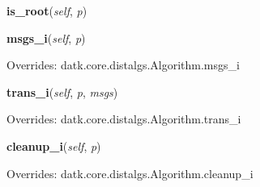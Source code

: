     \vspace{0.5ex}

\hspace{.8\funcindent}\begin{boxedminipage}{\funcwidth}

    \raggedright \textbf{is\_root}(\textit{self}, \textit{p})

\setlength{\parskip}{2ex}
\setlength{\parskip}{1ex}
    \end{boxedminipage}

    \vspace{0.5ex}

\hspace{.8\funcindent}\begin{boxedminipage}{\funcwidth}

    \raggedright \textbf{msgs\_i}(\textit{self}, \textit{p})

\setlength{\parskip}{2ex}
\setlength{\parskip}{1ex}
      Overrides: datk.core.distalgs.Algorithm.msgs\_i

    \end{boxedminipage}

    \vspace{0.5ex}

\hspace{.8\funcindent}\begin{boxedminipage}{\funcwidth}

    \raggedright \textbf{trans\_i}(\textit{self}, \textit{p}, \textit{msgs})

\setlength{\parskip}{2ex}
\setlength{\parskip}{1ex}
      Overrides: datk.core.distalgs.Algorithm.trans\_i

    \end{boxedminipage}

    \vspace{0.5ex}

\hspace{.8\funcindent}\begin{boxedminipage}{\funcwidth}

    \raggedright \textbf{cleanup\_i}(\textit{self}, \textit{p})

\setlength{\parskip}{2ex}
\setlength{\parskip}{1ex}
      Overrides: datk.core.distalgs.Algorithm.cleanup\_i

    \end{boxedminipage}

    \label{datk:core:algs:AsynchConvergecast:trans_root}

